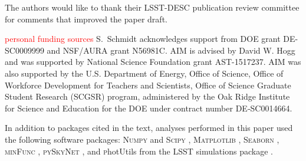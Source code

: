 \documentclass[\docopts]{\docclass}
\newcommand{\red}[1]{\textcolor{red}{#1}}
\begin{document}

The authors would like to thank their LSST-DESC publication review committee for comments that improved the paper draft.

{ \red{personal funding sources}}
S.~Schmidt acknowledges support from DOE grant DE-SC0009999 and NSF/AURA grant N56981C.
AIM is advised by David W. Hogg and was supported by National Science Foundation grant AST-1517237.
AIM was also supported by the U.S. Department of Energy, Office of 
Science, Office of Workforce Development for Teachers and Scientists, Office of 
Science Graduate Student Research (SCGSR) program, administered by the Oak 
Ridge Institute for Science and Education for the DOE under contract number 
DE‐SC0014664.

In addition to packages cited in the text, analyses performed in this paper used the following software packages: \textsc{Numpy} and \textsc{Scipy} \citep{numpyscipy}, \textsc{Matplotlib} \citep{matplotlib}, \textsc{Seaborn} \citep{seaborn}, \textsc{minFunc} \citep{minfunc}, \textsc{pySkyNet} \citep{pyskynet}, and {\textsc photUtils} from the LSST simulations package \citep{lsstphotutils}.



%
%






\end{document}
